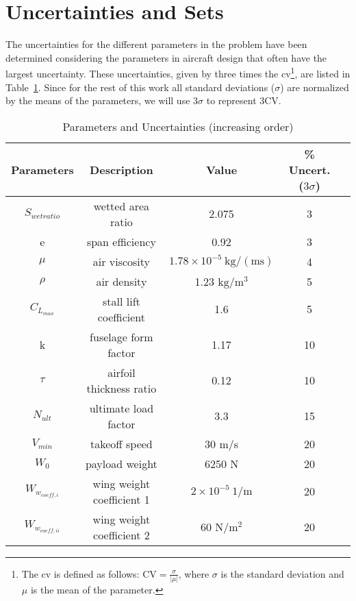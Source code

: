 \section{Uncertainties and Sets}
\label{uncertainties_and_sets}

The uncertainties for the different parameters in the problem have been determined
considering the parameters in aircraft design that often have the largest uncertainty.
These uncertainties, given by three times the \gls{cv}\footnote{The \gls{cv}
is defined as follows: $\text{CV} = \frac{\sigma}{|\mu|}$, where $\sigma$ is the standard deviation and $\mu$ is the mean of the parameter.},
are listed in Table~\ref{tab:uncertainties}. Since for the rest of this work
all standard deviations ($\sigma$) are normalized by the means of the parameters, we will use $3\sigma$
to represent $3\text{CV}$.

\begin{table}
\begin{center}
\caption{\label{tab:uncertainties} Parameters and Uncertainties (increasing order)}
\begin{tabular}{c c c c c}
\hline
Parameters & Description & Value & \% Uncert. ($3\sigma$) \\
\hline
$S_{wetratio}$ & wetted area ratio & 2.075 & 3\\
e & span efficiency & 0.92 & 3\\
$\mu$ & air viscosity & $1.78 \times 10^{-5}~\mathrm{kg/(ms)}$ & 4 \\
$\rho$ & air density & 1.23 $\mathrm{kg/m^3}$ & 5 \\
$C_{L_{max}}$ & stall lift coefficient & 1.6 & 5\\
k & fuselage form factor & 1.17 & 10\\
$\tau$ & airfoil thickness ratio & 0.12 & 10\\
$N_{ult}$ & ultimate load factor & 3.3 & 15\\
$V_{min}$ & takeoff speed & 30 m/s & 20\\
$W_0$ & payload weight & 6250 N & 20\\
$W_{w_{coeff,i}}$ & wing weight coefficient 1 & $2 \times 10^{-5}~1/\mathrm{m}$ & 20\\
$W_{w_{coeff,ii}}$ & wing weight coefficient 2 & 60 $\mathrm{N/m^2}$ & 20\\
\hline
\end{tabular}
\end{center}
\end{table}

